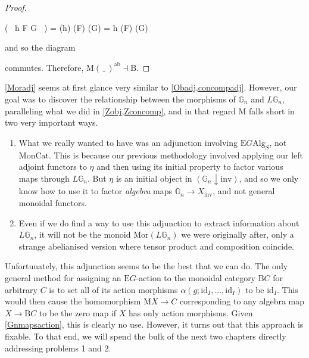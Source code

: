 \begin{proof}
\begin{eq*} ( \, h \circ F \circ G \, ) \quad = \quad {}(h) \circ {}(F) \circ {}(G) \quad = \quad h \circ {}(F) \circ {}(G) \end{eq*}
and so the diagram
\begin{eq*}  \end{eq*}
commutes. Therefore, $\mathrm{M}(\, \_ \,)^{\mathrm{ab}} \dashv \mathrm{B}$.
\end{proof}

\cref{Moradj} seems at first glance very similar to \cref{Obadj,concompadj}. However, our goal was to discover the relationship between the morphisms of $\mathbb{G}_n$ and $L\mathbb{G}_n$, paralleling what we did in \cref{Zobj,Zconcomp}, and in that regard $\mathrm{M}$ falls short in two very important ways. 

\begin{enumerate}
\item What we really wanted to have was an adjunction involving $\mathrm{E}G\mathrm{Alg}_S$, not $\mathrm{MonCat}$. This is because our previous methodology involved applying our left adjoint functors to $\eta$ and then using its initial property to factor various maps through $L\mathbb{G}_n$. But $\eta$ is an initial object in $(\mathbb{G}_n \downarrow \mathrm{inv})$, and so we only know how to use it to factor \emph{algebra} maps $\mathbb{G}_n \to X_{\mathrm{inv}}$, and not general monoidal functors. 
\item Even if we do find a way to use this adjunction to extract information about $L\mathbb{G}_n$, it will not be the monoid $\mathrm{Mor}(L\mathbb{G}_n)$ we were originally after, only a strange abelianised version where tensor product and composition coincide.  
\end{enumerate}

Unfortunately, this adjunction seems to be the best that we can do. The only general method for assigning an $\mathrm{E}G$-action to the monoidal category $\mathrm{B}C$ for arbitrary $C$ is to set all of its action morphisms $\alpha(g; \mathrm{id}_I, ..., \mathrm{id}_I)$ to be $\mathrm{id}_I$. This would then cause the homomorphism $\mathrm{M}X \to C$ corresponding to any algebra map $X \to \mathrm{B}C$ to be the zero map if $X$ has only action morphisms. Given \cref{Gnmapsaction}, this is clearly no use. However, it turns out that this approach is fixable. To that end, we will spend the bulk of the next two chapters directly addressing problems 1 and 2. 

